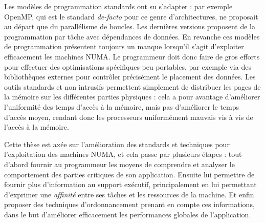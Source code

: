 Les modèles de programmation standards ont su s'adapter : par exemple OpenMP, qui est le standard \emph{de-facto} pour ce genre d'architectures, ne proposait au départ que du parallélisme de boucles. Les dernières versions proposent de la programmation par tâche avec dépendances de données.
En revanche ces modèles de programmation présentent toujours un manque lorsqu'il s'agit d'exploiter efficacement les machines NUMA.
Le programmeur doit donc faire de gros efforts pour effectuer des optimisations spécifiques peu portables, par exemple via des bibliothèques externes pour contrôler précisément le placement des données.
Les outils standards et non intrusifs permettent simplement de distribuer les pages de la mémoire sur les différentes parties physiques : cela a pour avantage d'améliorer l'uniformité des temps d'accès à la mémoire, mais pas d'améliorer le temps d'accès moyen, rendant donc les processeurs uniformément mauvais vis à vis de l'accès à la mémoire.

Cette thèse est axée sur l'amélioration des standards et techniques pour l'exploitation des machines NUMA, et cela passe par plusieurs étapes : tout d'abord fournir au programmeur les moyens de comprendre et analyser le comportement des parties critiques de son application.
Ensuite lui permettre de fournir plus d'information au support exécutif, principalement en lui permettant d'exprimer une \emph{affinité} entre ses tâches et les ressources de la machine.
Et enfin proposer des techniques d'ordonnancement prenant en compte ces informations, dans le but d'améliorer efficacement les performances globales de l'application.







